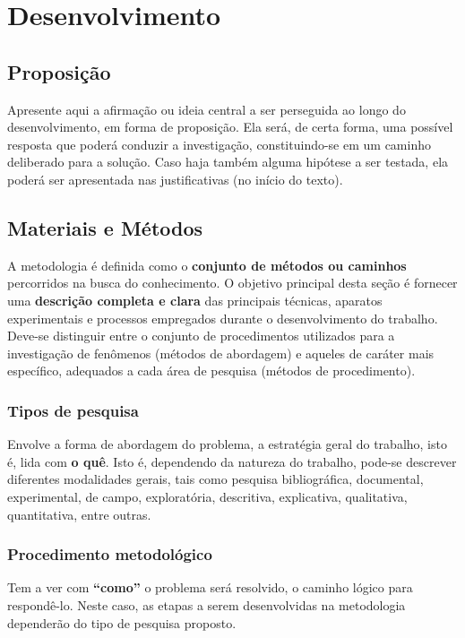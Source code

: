 \documentclass[
	12pt,				%
	openright,			%
	oneside,			%
	a4paper,			%
	english,			%
	brazil				%
	]{abntex2}
\begin{document}
\chapter{Desenvolvimento} \label{cap:desenvolvimento}  

\section{Proposição}
	Apresente aqui a afirmação ou ideia central a ser perseguida ao longo do desenvolvimento, em forma de proposição. Ela será, de certa forma, uma possível resposta que poderá conduzir a investigação, constituindo-se em um caminho deliberado para a solução. Caso haja também alguma hipótese a ser testada, ela poderá ser apresentada nas justificativas (no início do texto).
\section{Materiais e Métodos}
	A metodologia é definida como o \textbf{conjunto de métodos ou caminhos} percorridos na busca do conhecimento. O objetivo principal desta seção é fornecer uma \textbf{descrição completa e clara} das principais técnicas, aparatos experimentais e processos empregados durante o desenvolvimento do trabalho. Deve-se distinguir entre o conjunto de procedimentos utilizados para a investigação de fenômenos (métodos de abordagem) e aqueles de caráter mais específico, adequados a cada área de pesquisa (métodos de procedimento).

	\subsection{Tipos de pesquisa}
	 	Envolve a forma de abordagem do problema, a estratégia geral do trabalho, isto é, lida com \textbf{o quê}. Isto é, dependendo da natureza do trabalho, pode-se descrever diferentes modalidades gerais, tais como pesquisa bibliográfica, documental, experimental, de campo, exploratória, descritiva, explicativa, qualitativa, quantitativa, entre outras.
	\subsection{Procedimento metodológico}	
		Tem a ver com \textbf{``como''} o problema será resolvido, o caminho lógico para respondê-lo. Neste caso, as etapas a serem desenvolvidas na metodologia dependerão do tipo de pesquisa proposto.
\end{document}
